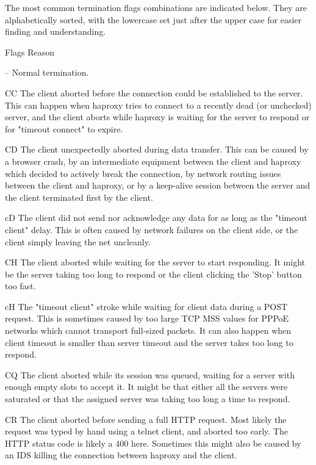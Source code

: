 The most common termination flags combinations are indicated below. They are
alphabetically sorted, with the lowercase set just after the upper case for
easier finding and understanding.

  Flags   Reason

     --   Normal termination.

     CC   The client aborted before the connection could be established to the
          server. This can happen when haproxy tries to connect to a recently
          dead (or unchecked) server, and the client aborts while haproxy is
          waiting for the server to respond or for "timeout connect" to expire.

     CD   The client unexpectedly aborted during data transfer. This can be
          caused by a browser crash, by an intermediate equipment between the
          client and haproxy which decided to actively break the connection,
          by network routing issues between the client and haproxy, or by a
          keep-alive session between the server and the client terminated first
          by the client.

     cD   The client did not send nor acknowledge any data for as long as the
          "timeout client" delay. This is often caused by network failures on
          the client side, or the client simply leaving the net uncleanly.

     CH   The client aborted while waiting for the server to start responding.
          It might be the server taking too long to respond or the client
          clicking the 'Stop' button too fast.

     cH   The "timeout client" stroke while waiting for client data during a
          POST request. This is sometimes caused by too large TCP MSS values
          for PPPoE networks which cannot transport full-sized packets. It can
          also happen when client timeout is smaller than server timeout and
          the server takes too long to respond.

     CQ   The client aborted while its session was queued, waiting for a server
          with enough empty slots to accept it. It might be that either all the
          servers were saturated or that the assigned server was taking too
          long a time to respond.

     CR   The client aborted before sending a full HTTP request. Most likely
          the request was typed by hand using a telnet client, and aborted
          too early. The HTTP status code is likely a 400 here. Sometimes this
          might also be caused by an IDS killing the connection between haproxy
          and the client.

